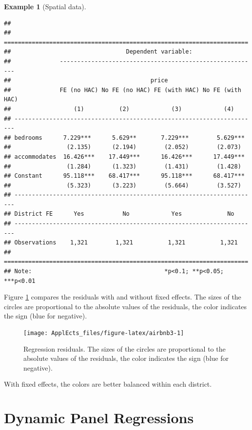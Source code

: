 \documentclass[
  12pt,
]{book}
\theoremstyle{definition}
\theoremstyle{definition}
\newtheorem{example}{Example}[chapter]
\theoremstyle{definition}
\theoremstyle{definition}
\theoremstyle{remark}
\begin{document}
\begin{example}[Spatial data]
\begin{verbatim}
## 
## ======================================================================
##                                 Dependent variable:                   
##              ---------------------------------------------------------
##                                        price                          
##              FE (no HAC) No FE (no HAC) FE (with HAC) No FE (with HAC)
##                  (1)          (2)            (3)            (4)       
## ----------------------------------------------------------------------
## bedrooms      7.229***      5.629**       7.229***        5.629***    
##                (2.135)      (2.194)        (2.052)        (2.073)     
## accommodates  16.426***    17.449***      16.426***      17.449***    
##                (1.284)      (1.323)        (1.431)        (1.428)     
## Constant      95.118***    68.417***      95.118***      68.417***    
##                (5.323)      (3.223)        (5.664)        (3.527)     
## ----------------------------------------------------------------------
## District FE      Yes           No            Yes             No       
## ----------------------------------------------------------------------
## Observations    1,321        1,321          1,321          1,321      
## ======================================================================
## Note:                                      *p<0.1; **p<0.05; ***p<0.01
\end{verbatim}

Figure \ref{fig:airbnb3} compares the residuals with and without fixed effects. The sizes of the circles are proportional to the absolute values of the residuals, the color indicates the sign (blue for negative).

\begin{figure}
\texttt{[image: ApplEcts\_files/figure-latex/airbnb3-1]} \caption{Regression residuals. The sizes of the circles are proportional to the absolute values of the residuals, the color indicates the sign (blue for negative).}\label{fig:airbnb3}
\end{figure}

With fixed effects, the colors are better balanced within each district.
\end{example}

\hypertarget{DynPanel}{%
\section{Dynamic Panel Regressions}\label{DynPanel}}
\end{document}
